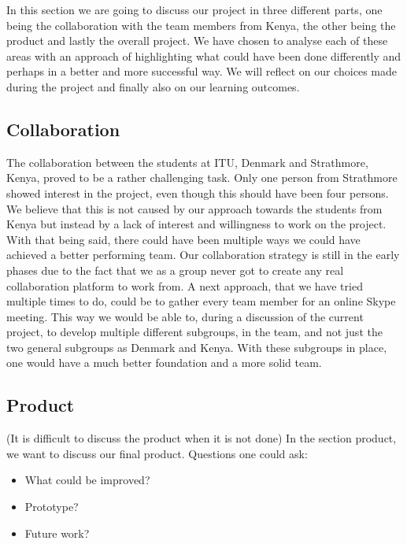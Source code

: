 In this section we are going to discuss our project in three different parts, one being the collaboration with the team members from Kenya, the other being the product and lastly the overall project. We have chosen to analyse each of these areas with an approach of highlighting what could have been done differently and perhaps in a better and more successful way. We will reflect on our choices made during the project and finally also on our learning outcomes.

\subsection{Collaboration}\label{subsec:collaboration}
The collaboration between the students at ITU, Denmark and Strathmore, Kenya, proved to be a rather challenging task. Only one person from Strathmore showed interest in the project, even though this should have been four persons. We believe that this is not caused by our approach towards the students from Kenya but instead by a lack of interest and willingness to work on the project.
With that being said, there could have been multiple ways we could have achieved a better performing team. Our collaboration strategy is still in the early phases due to the fact that we as a group never got to create any real collaboration platform to work from. 
A next approach, that we have tried multiple times to do, could be to gather every team member for an online Skype meeting. This way we would be able to, during a discussion of the current project, to develop multiple different subgroups, in the team, and not just the two general subgroups as Denmark and Kenya. With these subgroups in place, one would have a much better foundation and a more solid team.

\subsection{Product}\label{subsec:product}
(It is difficult to discuss the product when it is not done)
In the section product, we want to discuss our final product. Questions one could ask:

\begin{itemize}
	\item What could be improved?
	\item Prototype? %
	\item Future work?
\end{itemize}


